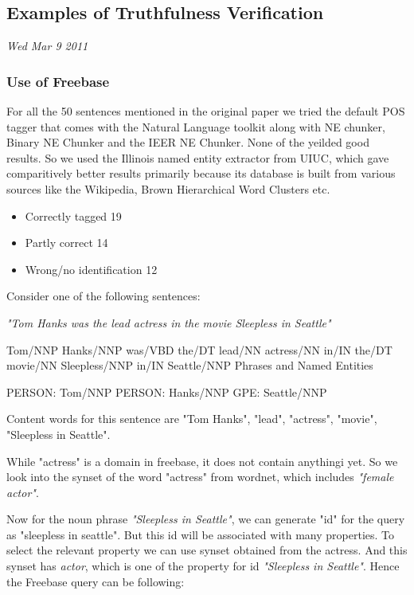 \documentclass[11pt]{article}
\begin{document}
\subsection{Examples of Truthfulness Verification}

{\em Wed Mar 9 2011}

\subsubsection{Use of Freebase}

For all the 50 sentences mentioned in the original paper we tried the default POS tagger that comes with the Natural Language toolkit along with NE chunker, Binary NE Chunker and the IEER NE Chunker. None of the yeilded good results. So we used the Illinois named entity extractor from UIUC, which gave comparitively better results primarily because its database is built from various sources like the Wikipedia, Brown Hierarchical Word Clusters etc. 

\begin{itemize}
\item Correctly tagged 19
\item Partly correct 14	
\item Wrong/no identification 12
\end{itemize}



Consider one of the following sentences:

\emph{"Tom Hanks was the lead actress in the movie Sleepless in Seattle"}

Tom/NNP Hanks/NNP was/VBD the/DT lead/NN actress/NN in/IN the/DT movie/NN Sleepless/NNP in/IN Seattle/NNP
Phrases and Named Entities

PERSON:
    Tom/NNP
PERSON:
    Hanks/NNP
GPE:
    Seattle/NNP

Content words for this sentence are "Tom Hanks", "lead", "actress", "movie", "Sleepless in Seattle". 

While "actress" is a domain in freebase, it does not contain anythingi yet. So we look into the synset of the word "actress" from wordnet, which includes \emph{"female actor"}.

Now for the noun phrase \emph{"Sleepless in Seattle"}, we can generate "id" for the query as "sleepless in seattle". But this id will be associated with many properties. To select the relevant property we can use synset obtained from the actress. And this synset has {\em actor}, which is one of the property for id {\em "Sleepless in Seattle"}. Hence the Freebase query can be following:
\end{document}
